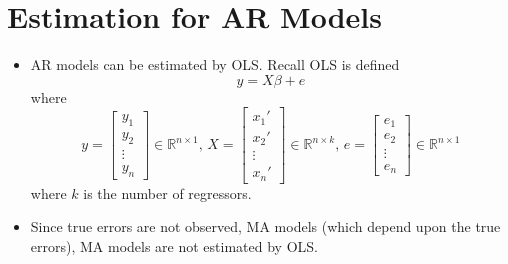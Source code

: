 \documentclass[11pt]{article}
\begin{document}
\section{Estimation for AR Models}
\begin{itemize}
    \item AR models can be estimated by OLS. Recall OLS is defined
    \[y = X\beta + e\]
    where 
    \[
    y = \begin{bmatrix}
        y_1 \\
        y_2 \\
        \vdots \\
        y_n
    \end{bmatrix} \in \mathbb{R}^{n \times 1}, \,
    X = \begin{bmatrix}
        x_1' \\
        x_2' \\
        \vdots \\
        x_n'
    \end{bmatrix} \in \mathbb{R}^{n \times k}, \, 
    e = \begin{bmatrix}
        e_1 \\
        e_2 \\
        \vdots \\
        e_n
    \end{bmatrix} \in \mathbb{R}^{n \times 1}
    \]
    where $k$ is the number of regressors.   

    \item Since true errors are not observed, MA models (which depend upon the true errors), MA 
    models are not estimated by OLS. 
\end{itemize}
\end{document}
